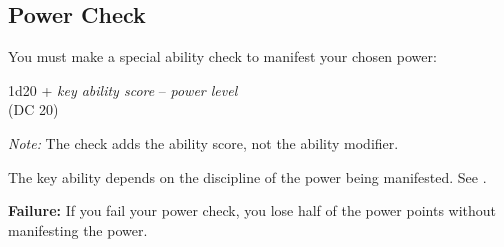 \subsection{Power Check}
You must make a special ability check to manifest your chosen power:

\begin{Formula}{1d20 + \textit{key ability score} -- \textit{power level}\\(DC 20)}
\end{Formula}

\textit{Note:} The check adds the ability score, not the ability modifier.

The key ability depends on the discipline of the power being manifested. See .


\textbf{Failure:} If you fail your power check, you lose half of the power points without manifesting the power.